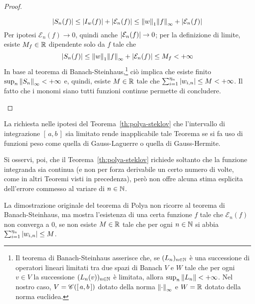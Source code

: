 \begin{proof}
\begin{description}
			\begin{equation*}
				\abs{S_n (f)} \le \abs{I_w (f)} + \abs{\mathcal{E}_n (f)} \le \norm{w}_1 \norm{f}_\infty + \abs{\mathcal{E}_n (f)}
			\end{equation*}
			 Per ipotesi \(\mathcal{E}_n (f) \to 0\), quindi anche \(\abs{\mathcal{E}_n (f)} \to 0\); per la definizione di limite, esiste \(M_f \in \mathbb{R}\) dipendente solo da \(f\) tale che
			 \begin{equation*}
			 	\abs{S_n (f)} \le \norm{w}_1 \norm{f}_\infty + \abs{\mathcal{E}_n (f)} \le M_f < + \infty
			 \end{equation*}
		 	In base al teorema di Banach-Steinhaus,\footnote{Il teorema di Banach-Steinhaus asserisce che, se \((L_n)_{n \in \mathbb{N}}\) è una successione di operatori lineari limitati tra due spazi di Banach \(V \!\) e \(W \!\) tale che per ogni \(v \in V\) la successione \((L_n (v))_{n \in \mathbb{N}}\) è limitata, allora \(\sup_n \norm{L_n} < + \infty\). Nel nostro caso, \(V = \mathscr{C} ([\, a, b \,])\) dotato della norma \(\norm{\cdot}_\infty\) e \(W = \mathbb{R}\) dotato della norma euclidea.} ciò implica che esiste finito \(\sup_n \norm{S_n}_\infty < + \infty\) e, quindi, esiste \(M \in \mathbb{R}\) tale che \(\sum_{i = 1}^{\eta_n} \abs{w_{i, n}} \le M < + \infty\). Il fatto che i monomi siano tutti funzioni continue permette di concludere.\qedhere
		\end{description}
	\end{proof}

	\begin{osservazione}
		La richiesta nelle ipotesi del Teorema~\ref{th:polya-steklov} che l'intervallo di integrazione \([\, a, b \,]\) sia limitato rende inapplicabile tale Teorema se si fa uso di funzioni peso come quella di Gauss-Laguerre o quella di Gauss-Hermite.
		
		Si osservi, poi, che il Teorema~\ref{th:polya-steklov} richiede soltanto che la funzione integranda sia continua (e non per forza derivabile un certo numero di volte, come in altri Teoremi visti in precedenza), però non offre alcuna stima esplicita dell'errore commesso al variare di \(n \in \mathbb{N}\).
	\end{osservazione}

	\begin{nota}
		La dimostrazione originale del teorema di Polya non ricorre al teorema di Banach-Steinhaus, ma mostra l'esistenza di una certa funzione \(f\) tale che \(\mathcal{E}_n (f)\) non converga a \(0\), se non esiste \(M \in \mathbb{R}\) tale che per ogni \(n \in \mathbb{N}\) si abbia \(\sum_{i = 1}^{\eta_n} \abs{w_{i, n}} \le M\).
	\end{nota}


